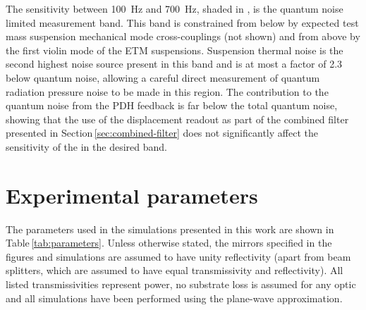 The sensitivity between \SI{100}{\hertz} and \SI{700}{\hertz}, shaded in , is the quantum noise limited measurement band. This band is constrained from below by expected test mass suspension mechanical mode cross-couplings (not shown) and from above by the first violin mode of the ETM suspensions. Suspension thermal noise is the second highest noise source present in this band and is at most a factor of \SI{2.3}{} below quantum noise, allowing a careful direct measurement of quantum radiation pressure noise to be made in this region. The contribution to the quantum noise from the PDH feedback is far below the total quantum noise, showing that the use of the displacement readout as part of the combined filter presented in Section\,\ref{sec:combined-filter} does not significantly affect the sensitivity of the \SSM{} in the desired band.

\section{\label{sec:control-parameters}Experimental parameters}
The parameters used in the simulations presented in this work are shown in Table\,\ref{tab:parameters}. Unless otherwise stated, the mirrors specified in the figures and simulations are assumed to have unity reflectivity (apart from beam splitters, which are assumed to have equal transmissivity and reflectivity). All listed transmissivities represent power, no substrate loss is assumed for any optic and all simulations have been performed using the plane-wave approximation.

